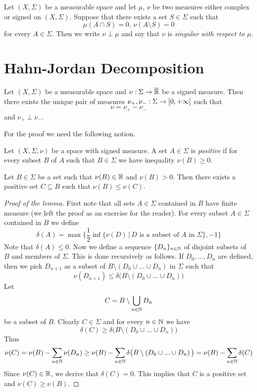 \begin{definition}
Let $(X,\Sigma)$ be a measurable space and let $\mu$, $\nu$ be two measures either complex or signed on $(X,\Sigma)$. Suppose that there exists a set $S\in \Sigma$ such that
$$\mu(A\cap S) = 0,\,\nu(A\setminus S) = 0$$
for every $A \in \Sigma$. Then we write $\nu \perp \mu$ and say that $\nu$ is \textit{singular with respect to $\mu$}.
\end{definition}

\section{Hahn-Jordan Decomposition}

\begin{theorem}\label{theorem:jordansdecomposition}
Let $\left(X,\Sigma\right)$ be a measurable space and $\nu:\Sigma\rightarrow \overline{{\mathbb R}}$ be a signed measure. Then there exists the unique pair of measures $\nu_+,\nu_-:\Sigma \rightarrow [0,+\infty]$ such that  
$$\nu = \nu_+ - \nu_-$$
and $\nu_+ \perp \nu_-$.
\end{theorem}
\noindent
For the proof we need the following notion.

\begin{definition}
Let $(X,\Sigma,\nu)$ be a space with signed measure. A set $A\in \Sigma$ is \textit{positive} if for every subset $B$ of $A$ such that $B\in \Sigma$ we have inequality $\nu(B)\geq 0$. 
\end{definition}

\begin{lemma}\label{lemma:positiveexist}
Let $B\in \Sigma$ be a set such that $\nu(B)\in {\mathbb R}$ and $\nu(B)>0$. Then there exists a positive set $C\subseteq B$ such that $\nu(B)\leq \nu(C)$.
\end{lemma}
\begin{proof}[Proof of the lemma]
First note that all sets $A\in \Sigma$ contained in $B$ have finite measure (we left the proof as an exercise for the reader). For every subset $A\in \Sigma$ contained in $B$ we define
$$\delta(A) = \max\bigg\{\frac{1}{2}\inf\big\{\nu(D)\,\big|\,D\mbox{ is a subset of }A\mbox{ in }\Sigma\big\},-1\bigg\}$$
Note that $\delta(A)\leq 0$. Now we define a sequence $\{D_n\}_{n\in {\mathbb N}}$ of disjoint subsets of $B$ and members of $\Sigma$. This is done recursively as follows. If $D_0,...,D_n$ are defined, then we pick $D_{n+1}$ as a subset of $B\setminus \left(D_0\cup...\cup D_n\right)$ in $\Sigma$ such that
$$\nu(D_{n+1})\leq \delta\big(B\setminus \left(D_0\cup...\cup D_n\right)\big)$$
Let
$$C = B\setminus \bigcup_{n\in {\mathbb N}}D_n$$
be a subset of $B$. Clearly $C\in \Sigma$ and for every $n\in {\mathbb N}$ we have
$$\delta(C) \geq \delta\big(B\setminus \left(D_0\cup...\cup D_n\right)\big)$$
Thus
$$\nu(C) = \nu(B)-\sum_{n\in {\mathbb N}}\nu(D_n) \geq \nu(B) -\sum_{n\in {\mathbb N}}\delta\big(B\setminus \left(D_0\cup...\cup D_n\right)\big) = \nu(B) -\sum_{n\in {\mathbb N}}\delta(C)$$
Since $\nu(C)\in {\mathbb R}$, we derive that $\delta(C)=0$. This implies that $C$ is a positive set and $\nu(C)\geq \nu(B)$.
\end{proof}

